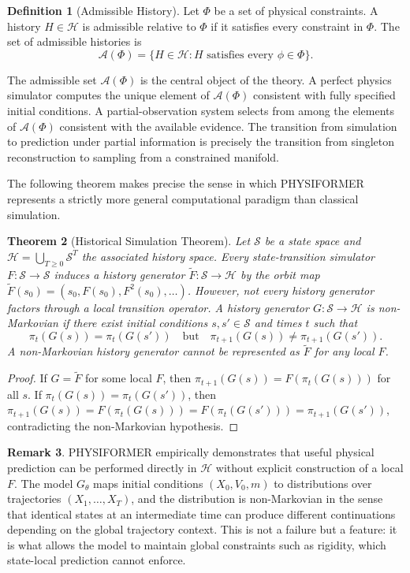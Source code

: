 \documentclass[12pt,oneside]{article}
\newtheorem{theorem}{Theorem}[section]
\theoremstyle{definition}
\newtheorem{definition}[theorem]{Definition}
\newtheorem{remark}[theorem]{Remark}
\newcommand{\A}{\mathcal{A}}
\newcommand{\H}{\mathcal{H}}
\begin{document}
\begin{definition}[Admissible History]
Let \(\Phi\) be a set of physical constraints. A history \(H \in \H\) is admissible
relative to \(\Phi\) if it satisfies every constraint in \(\Phi\). The set of admissible
histories is
\[
\A(\Phi) = \{H \in \H : H \text{ satisfies every } \phi \in \Phi\}.
\]
\end{definition}

The admissible set \(\A(\Phi)\) is the central object of the theory. A perfect physics
simulator computes the unique element of \(\A(\Phi)\) consistent with fully specified
initial conditions. A partial-observation system selects from among the elements of
\(\A(\Phi)\) consistent with the available evidence. The transition from simulation to
prediction under partial information is precisely the transition from singleton
reconstruction to sampling from a constrained manifold.

The following theorem makes precise the sense in which PHYSIFORMER represents a strictly
more general computational paradigm than classical simulation.

\begin{theorem}[Historical Simulation Theorem]
Let \(\mathcal{S}\) be a state space and \(\H = \bigcup_{T \geq 0} \mathcal{S}^T\)
the associated history space. Every state-transition simulator \(F : \mathcal{S} \to \mathcal{S}\)
induces a history generator \(\widetilde{F} : \mathcal{S} \to \H\) by the orbit map
\(\widetilde{F}(s_0) = (s_0, F(s_0), F^2(s_0), \ldots)\). However, not every history
generator factors through a local transition operator. A history generator
\(G : \mathcal{S} \to \H\) is non-Markovian if there exist initial conditions
\(s, s' \in \mathcal{S}\) and times \(t\) such that
\[
\pi_t(G(s)) = \pi_t(G(s'))
\quad \text{but} \quad
\pi_{t+1}(G(s)) \neq \pi_{t+1}(G(s')).
\]
A non-Markovian history generator cannot be represented as \(\widetilde{F}\) for any
local \(F\).
\end{theorem}

\begin{proof}
If \(G = \widetilde{F}\) for some local \(F\), then \(\pi_{t+1}(G(s)) = F(\pi_t(G(s)))\)
for all \(s\). If \(\pi_t(G(s)) = \pi_t(G(s'))\), then
\(\pi_{t+1}(G(s)) = F(\pi_t(G(s))) = F(\pi_t(G(s'))) = \pi_{t+1}(G(s'))\),
contradicting the non-Markovian hypothesis.
\end{proof}

\begin{remark}
PHYSIFORMER empirically demonstrates that useful physical prediction can be performed
directly in \(\H\) without explicit construction of a local \(F\). The model \(G_\theta\)
maps initial conditions \((X_0, V_0, m)\) to distributions over trajectories
\((X_1, \ldots, X_T)\), and the distribution is non-Markovian in the sense that
identical states at an intermediate time can produce different continuations depending
on the global trajectory context. This is not a failure but a feature: it is what allows
the model to maintain global constraints such as rigidity, which state-local prediction
cannot enforce.
\end{remark}
\end{document}
